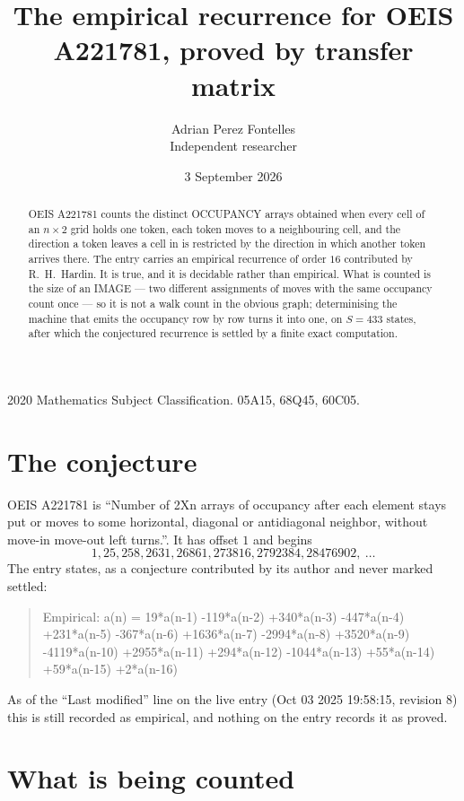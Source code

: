 \documentclass[11pt,a4paper]{article}
\title{The empirical recurrence for OEIS A221781, proved by transfer matrix}
\author{Adrian Perez Fontelles\\ \small Independent researcher}
\date{3 September 2026}
\theoremstyle{plain}
\theoremstyle{definition}
\begin{document}
\maketitle

\begin{abstract}
OEIS A221781 counts the distinct OCCUPANCY arrays obtained when every cell of an $n\times2$ grid
holds one token, each token moves to a neighbouring cell, and the direction a token leaves a
cell in is restricted by the direction in which another token arrives there. The entry carries
an empirical recurrence of order $16$ contributed by R.~H.~Hardin. It is true, and it is
decidable rather than empirical. What is counted is the size of an IMAGE --- two different
assignments of moves with the same occupancy count once --- so it is not a walk count in the
obvious graph; determinising the machine that emits the occupancy row by row turns it into
one, on $S=433$ states, after which the conjectured recurrence is settled by a finite exact
computation.
\end{abstract}

\noindent\small 2020 Mathematics Subject Classification. 05A15, 68Q45, 60C05.\normalsize

\section{The conjecture}

OEIS A221781 is ``Number of 2Xn arrays of occupancy after each element stays put or moves to some horizontal, diagonal or antidiagonal neighbor, without move-in move-out left turns.''. It has offset $1$ and begins
\[
1, 25, 258, 2631, 26861, 273816, 2792384, 28476902,\ \dots
\]
The entry states, as a conjecture contributed by its author and never marked settled:
\begin{quote}
Empirical: a(n) = 19*a(n-1) -119*a(n-2) +340*a(n-3) -447*a(n-4) +231*a(n-5) -367*a(n-6) +1636*a(n-7) -2994*a(n-8) +3520*a(n-9) -4119*a(n-10) +2955*a(n-11) +294*a(n-12) -1044*a(n-13) +55*a(n-14) +59*a(n-15) +2*a(n-16)
\end{quote}
As of the ``Last modified'' line on the live entry (Oct 03 2025 19:58:15, revision 8) this is still
recorded as empirical, and nothing on the entry records it as proved.

\section{What is being counted}
\end{document}

